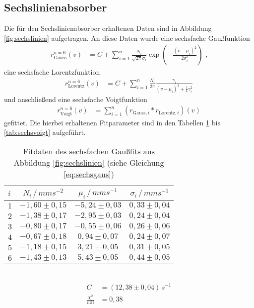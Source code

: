 \subsection{Sechslinienabsorber}

Die für den Sechslinienabsorber erhaltenen Daten sind in Abbildung \ref{fig:sechslinien} aufgetragen. An diese Daten wurde eine sechsfache Gaußfunktion
\begin{align}
r_\mathrm{Gauss}^{n=6}(v)&=C+\sum_{i=1}^n\frac{N_i}{\sqrt{2\pi}\sigma_i}\exp(-\frac{(v-\mu_i)^2}{2\sigma_i^2})\text{ ,}\label{eq:sechsgaus}
\end{align}
eine sechsfache Lorentzfunktion 
\begin{align}
r_\mathrm{Lorentz}^{n=6}(v)&=C+\sum_{i=1}^n\frac{N_i}{2\pi}\frac{\gamma_i}{\left(v-\mu_i\right)^2+\frac14\gamma_i^2}\label{eq:sechslorentz}
\end{align}
und anschließend eine sechsfache Voigtfunktion 
\begin{align}
r_\mathrm{Voigt}^{n=6}(v)&=\sum_{i=1}^n\left(r_{\mathrm{Gauss}, i}*r_{\mathrm{Lorentz}, i}\right)(v)\label{eq:sechsvoigt}
\end{align}
gefittet. Die hierbei erhaltenen Fitparameter sind in den Tabellen \ref{tab:sechsgaus} bis \ref{tab:sechsvoigt} aufgeführt.

\begin{table}[h!]
	\centering
	\begin{tabular}{l|ccc}
		$i$&$N_i\,/\,\si{mms^{-2}}$&$\mu_i\,/\,\si{mms^{-1}}$&$\sigma_i\,/\,\si{mms^{-1}}$\\\hline
		$1$&$-1,60\pm0,15$&$-5,24\pm0,03$&$0,33\pm0,04$\\
		$2$&$-1,38\pm0,17$&$-2,95\pm0,03$&$0,24\pm0,04$\\
		$3$&$-0,80\pm0,17$&$-0,55\pm0,06$&$0,26\pm0,06$\\
		$4$&$-0,67\pm0,18$&$ 0,94\pm0,07$&$0,24\pm0,07$\\
		$5$&$-1,18\pm0,15$&$ 3,21\pm0,05$&$0,31\pm0,05$\\
		$6$&$-1,43\pm0,13$&$ 5,43\pm0,05$&$0,44\pm0,05$\\
	\end{tabular}\\
	\begin{align*}
		C&=(12,38\pm0,04)\,\si{s^{-1}}\\
		\frac{\chi^2}{\mathrm{ndf}}&=0,38
	\end{align*}
	\caption[Fitdaten des sechsfachen Gaußfits]{Fitdaten des sechsfachen Gaußfits aus Abbildung \ref{fig:sechslinien} (siehe Gleichung \ref{eq:sechsgaus})}
	\label{tab:sechsgaus}
\end{table}

